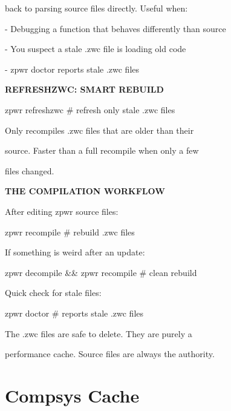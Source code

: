 \documentclass[11pt,a4paper,twoside]{book}
\begin{document}
back to parsing source files directly. Useful when:

- Debugging a function that behaves differently than source

- You suspect a stale .zwc file is loading old code

- zpwr doctor reports stale .zwc files


\vspace{12pt}
{\bfseries\color{neonyellow} REFRESHZWC: SMART REBUILD}\vspace{4pt}

\begin{codebox}
zpwr refreshzwc                     \# refresh only stale .zwc files\\
\end{codebox}

Only recompiles .zwc files that are older than their

source. Faster than a full recompile when only a few

files changed.


\vspace{12pt}
{\bfseries\color{neonyellow} THE COMPILATION WORKFLOW}\vspace{4pt}

After editing zpwr source files:

\begin{codebox}
zpwr recompile                    \# rebuild .zwc files\\
\end{codebox}

If something is weird after an update:

\begin{codebox}
zpwr decompile \&\& zpwr recompile  \# clean rebuild\\
\end{codebox}

Quick check for stale files:

\begin{codebox}
zpwr doctor                       \# reports stale .zwc files\\
\end{codebox}

The .zwc files are safe to delete. They are purely a

performance cache. Source files are always the authority.


\vspace{16pt}

\section{Compsys Cache}
\end{document}
